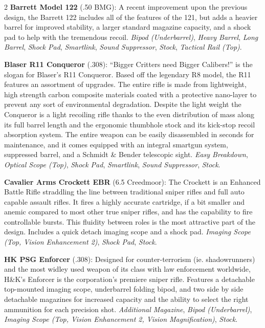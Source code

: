 \documentclass[
  oneside]{article}
\begin{document}
\begin{multicols}{2}
\textbf{Barrett Model 122} (.50 BMG): A recent
improvement upon the previous design, the Barrett
122 includes all of the features of the 121, but
adds a heavier barrel for improved stability, a
larger standard magazine capacity, and a shock pad
to help with the tremendous recoil. \emph{Bipod
(Underbarrel)}, \emph{Heavy Barrel}, \emph{Long
Barrel}, \emph{Shock Pad}, \emph{Smartlink},
\emph{Sound Suppressor}, \emph{Stock},
\emph{Tactical Rail (Top)}.

\textbf{Blaser R11 Conqueror} (.308): ``Bigger
Critters need Bigger Calibers!'' is the slogan for
Blaser's R11 Conqueror. Based off the legendary R8
model, the R11 features an assortment of upgrades.
The entire rifle is made from lightweight, high
strength carbon composite materials coated with a
protective nano-layer to prevent any sort of
environmental degradation. Despite the light
weight the Conqueror is a light recoiling rifle
thanks to the even distribution of mass along its
full barrel length and the ergonomic thumbhole
stock and its kick-stop recoil absorption system.
The entire weapon can be easily disassembled in
seconds for maintenance, and it comes equipped
with an integral smartgun system, suppressed
barrel, and a Schmidt \& Bender telescopic sight.
\emph{Easy Breakdown}, \emph{Optical Scope (Top)},
\emph{Shock Pad}, \emph{Smartlink}, \emph{Sound
Suppressor}, \emph{Stock}.

\textbf{Cavalier Arms Crockett EBR} (6.5
Creedmoor): The Crockett is an Enhanced Battle
Rifle straddling the line between traditional
sniper rifles and full auto capable assault
rifles. It fires a highly accurate cartridge, if a
bit smaller and anemic compared to most other true
sniper rifles, and has the capability to fire
controllable bursts. This fluidity between roles
is the most attractive part of the design.
Includes a quick detach imaging scope and a shock
pad. \emph{Imaging Scope (Top, Vision Enhancement
2)}, \emph{Shock Pad}, \emph{Stock}.

\textbf{HK PSG Enforcer} (.308): Designed for
counter-terrorism (ie. shadowrunners) and the most
widley used weapon of its class with law
enforcement worldwide, H\&K's Enforcer is the
corporation's premiere sniper rifle. Features a
detachable top-mounted imaging scope, underbarrel
folding bipod, and two side by side detachable
magazines for increased capacity and the ability
to select the right ammunition for each precision
shot. \emph{Additional Magazine}, \emph{Bipod
(Underbarrel)}, \emph{Imaging Scope (Top, Vision
Enhancement 2, Vision Magnification)},
\emph{Stock}.


\end{multicols}
\end{document}

